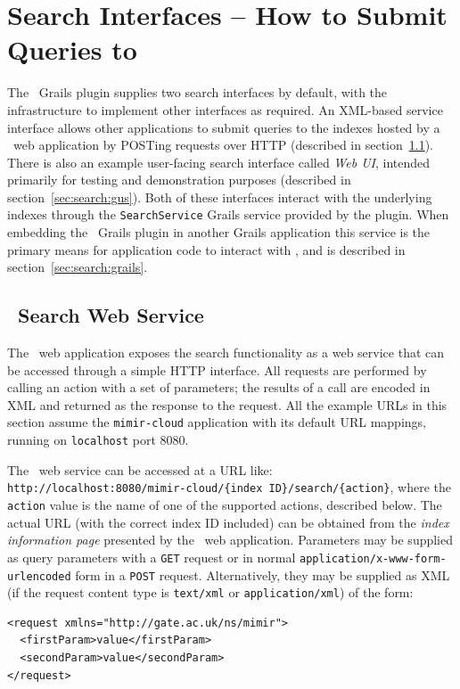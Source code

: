 \section{Search Interfaces -- How to Submit Queries to \Mimir}
\label{sec:search:interfaces}

The \Mimir\ Grails plugin supplies two search interfaces by default, with the
infrastructure to implement other interfaces as required.  An XML-based service
interface allows other applications to submit queries to the indexes hosted by
a \Mimir\ web application by POSTing requests over HTTP (described in
section~\ref{sec:search:service}).  There is also an example user-facing search
interface called {\em Web UI}, intended primarily for testing and demonstration
purposes (described in section~\ref{sec:search:gus}).  Both of these interfaces
interact with the underlying indexes through the {\tt SearchService} Grails
service provided by the plugin.  When embedding the \Mimir\ Grails plugin in
another Grails application this service is the primary means for application
code to interact with \Mimir, and is described in
section~\ref{sec:search:grails}.

\subsection{\Mimir\ Search Web Service}\label{sec:search:service}

The \Mimir\ web application exposes the search functionality as a web service
that can be accessed through a simple HTTP interface. All requests are performed
by calling an action with a set of parameters; the results of a call are encoded
in XML and returned as the response to the request.  All the example URLs in
this section assume the {\tt mimir-cloud} application with its
default URL mappings, running on {\tt localhost} port 8080.

The \Mimir\ web service can be accessed at a URL like:\\
{\tt http://localhost:8080/mimir-cloud/\{index ID\}/search/\{action\}},
where the {\tt action} value is the name of one of the supported actions,
described below. The actual URL (with the correct index ID included) can be
obtained from the {\em index information page} presented by  the \Mimir\ web
application.  Parameters may be supplied as query parameters with a {\tt GET}
request or in normal {\tt application/x-www-form-urlencoded} form in a
{\tt POST} request.  Alternatively, they may be supplied as XML (if the request
content type is {\tt text/xml} or {\tt application/xml}) of the form:
\begin{verbatim}
<request xmlns="http://gate.ac.uk/ns/mimir">
  <firstParam>value</firstParam>
  <secondParam>value</secondParam>
</request>
\end{verbatim}

